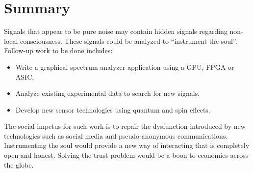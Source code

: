 \section{Summary}

Signals that appear to be pure noise may contain hidden signals regarding non-local consciousness.
These signals could be analyzed to ``instrument the soul''.
Follow-up work to be done includes:

\begin{itemize}
	\item Write a graphical spectrum analyzer application using a GPU, FPGA or ASIC.
	\item Analyze existing experimental data to search for new signals.
	\item Develop new sensor technologies using quantum and spin effects.
\end{itemize}

The social impetus for such work is to repair the dysfunction introduced by
new technologies such as social media and pseudo-anonymous communications.
Instrumenting the soul would provide a new way of interacting that is completely open and honest.
Solving the trust problem would be a boon to economies across the globe.
